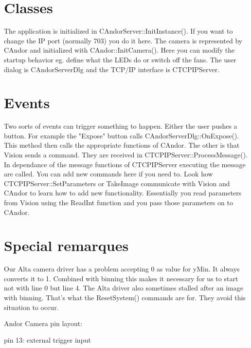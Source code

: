 \documentclass[10pt]{article}
\begin{document}
\section{Classes}

The application is initialized in CAndorServer::InitInstance().
If you want to change the IP port (normally 703) you do it here.
The camera is represented by CAndor and initialized with
CAndor::InitCamera(). Here you can modify the startup behavior
eg. define what the LEDs do or switch off the fans. The user
dialog is CAndorServerDlg and the TCP/IP interface is
CTCPIPServer.

\section{Events}

Two sorts of events can trigger something to happen. Either the
user pushes a button. For example the "Expose" button calls
CAndorServerDlg::OnExpose(). This method then calls the
appropriate functions of CAndor. The other is that Vision sends a
command. They are received in CTCPIPServer::ProcessMessage(). In
dependance of the message functions of CTCPIPServer executing the
message are called. You can add new commands here if you need to.
Look how CTCPIPServer::SetParameters or TakeImage communicate with
Vision and CAndor to learn how to add new functionality.
Essentially you read parameters from Vision using the ReadInt
function and you pass those parameters on to CAndor.

\section{Special remarques}

Our Alta camera driver has a problem accepting 0 as value for
yMin. It always converts it to 1. Combined with binning this makes
it necessary for us to start not with line 0 but line 4. The Alta
driver also sometimes stalled after an image with binning. That's
what the ResetSystem() commands are for. They avoid this situation
to occur.


Andor Camera pin layout:

pin 13: external trigger input
\end{document}
